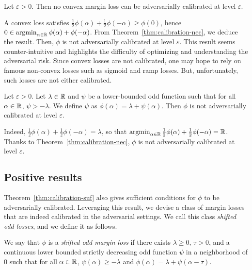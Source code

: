 \begin{coro} Let $\varepsilon>0$. Then no convex margin loss can be adversarially calibrated at level $\varepsilon$.
\end{coro} 


A convex loss satisfies $\frac12\phi(\alpha)+\frac12\phi(-\alpha)\geq \phi(0)$, hence $0\in \operatorname*{argmin}_{\alpha\in\mathbb{R}}
\phi(\alpha)+\phi(-\alpha)$. From Theorem~\ref{thm:calibration-nec}, we deduce the result.   Then, $\phi$ is not adversarially calibrated at level $\varepsilon$. This result seems counter-intuitive and highlights the difficulty of optimizing and understanding the adversarial risk. Since  convex losses are not calibrated, one may hope to rely on  famous non-convex losses such as sigmoid and ramp losses. But, unfortunately, such losses are not either calibrated.




\begin{coro} Let $\varepsilon>0$. Let $\lambda\in \mathbb{R}$ and \textcolor{black}{$\psi$} be a lower-bounded odd function such that for all $\alpha\in\mathbb{R}$, $\psi>-\lambda$. We define $\psi$ as  $\phi(\alpha) = \lambda +\psi(\alpha)$. Then $\phi$ is not adversarially calibrated at level $\varepsilon$.
\end{coro}
Indeed, $\frac12{\phi}(\alpha)+\frac12{\phi}(-\alpha) =  \lambda$, so that $ \operatorname*{argmin}_{\alpha\in\mathbb{R}}
\frac12\phi(\alpha)+\frac12\phi(-\alpha) = \mathbb{R}$. Thanks to Theorem~\ref{thm:calibration-nec}, $\phi$ is not adversarially calibrated at level $\varepsilon$.


\subsection{Positive results}

Theorem~\ref{thm:calibration-suf} also gives sufficient conditions for $\phi$ to be adversarially calibrated. Leveraging this result, we devise a class of margin losses that are indeed calibrated in the adversarial settings. We call this class \emph{shifted odd losses}, and we define it as follows.
\begin{definition}
\label{def:shifted}
We say that $\phi$ is a \emph{shifted odd margin loss} if there exists $\lambda\geq0$, $\tau>0$, and a continuous lower bounded strictly decreasing odd function \textcolor{black}{$\psi$} in a neighborhood of $0$ such that for all $\alpha\in\mathbb{R}$, $\psi(\alpha)\geq -\lambda$ and $\phi(\alpha) = \lambda+\psi(\alpha-\tau)$. 
\end{definition}


